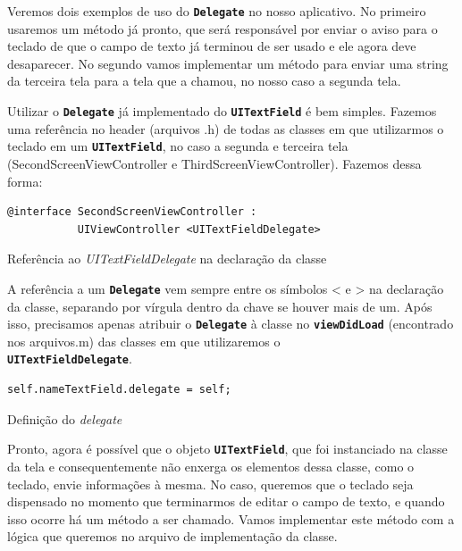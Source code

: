 \documentclass[a4paper,12pt,brazil,doubleside]{book}
\begin{document}
\begin{singlespace}
Veremos dois exemplos de uso do \texttt{\textbf{Delegate}} no nosso aplicativo. No primeiro usaremos um método já pronto, que será responsável por enviar o aviso para o teclado de que o campo de texto já terminou de ser usado e ele agora deve desaparecer. No segundo vamos implementar um método para enviar uma string da terceira tela para a tela que a chamou, no nosso caso a segunda tela.

Utilizar o \texttt{\textbf{Delegate}} já implementado do \texttt{\textbf{UITextField}} é bem simples. Fazemos uma referência no header (arquivos .h) de todas as classes em que utilizarmos o teclado em um \texttt{\textbf{UITextField}}, no caso a segunda e terceira tela (SecondScreenViewController e ThirdScreenViewController). Fazemos dessa forma:

\begin{listing}[H]
\begin{verbatim}
@interface SecondScreenViewController :
           UIViewController <UITextFieldDelegate>
\end{verbatim}
\caption{Referência ao \emph{UITextFieldDelegate} na declaração da classe}
\end{listing}


A referência a um \texttt{\textbf{Delegate}} vem sempre entre os símbolos < e > na declaração da classe, separando por vírgula dentro da chave se houver mais de um. Após isso, precisamos apenas atribuir o \texttt{\textbf{Delegate}} à classe no \texttt{\textbf{viewDidLoad}} (encontrado nos arquivos.m) das classes em que utilizaremos o\\ \texttt{\textbf{UITextFieldDelegate}}.

\begin{listing}[H]
\begin{verbatim}
self.nameTextField.delegate = self;
\end{verbatim}
\caption{Definição do \emph{delegate}}
\end{listing}

Pronto, agora é possível que o objeto \texttt{\textbf{UITextField}}, que foi instanciado na classe da tela e consequentemente não enxerga os elementos dessa classe, como o teclado, envie informações à mesma. No caso, queremos que o teclado seja dispensado no momento que terminarmos de editar o campo de texto, e quando isso ocorre há um método a ser chamado. Vamos implementar este método com a lógica que queremos no arquivo de implementação da classe.


\end{singlespace}
\end{document}
